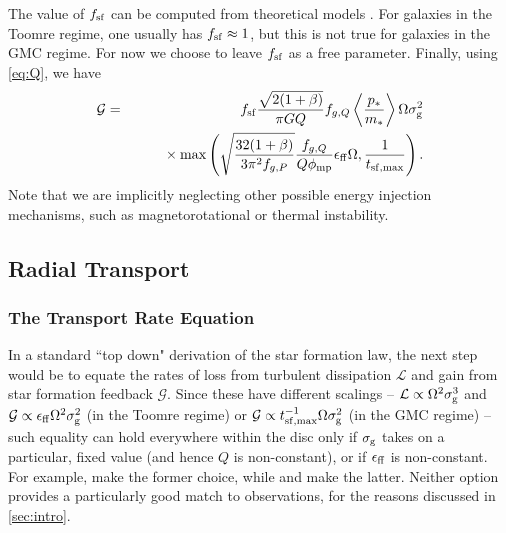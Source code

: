 \documentclass[useAMS,usenatbib]{mn2e}
\newcommand{\calL}{\mathcal{L}}
\newcommand{\calG}{\mathcal{G}}
\newcommand{\phimp}{\phi_{\mathrm{mp}}}
\begin{document}
The value of $f_{\rm sf}$ can be computed from theoretical models \citep[e.g.,][]{krumholz09a, krumholz09b, mckee10a, krumholz13c}. For galaxies in the Toomre regime, one usually has $f_{\rm sf}\approx 1$, but this is not true for galaxies in the GMC regime. For now we choose to leave $f_{\rm sf}$ as a free parameter. Finally, using \autoref{eq:Q}, we have
\begin{eqnarray}
\mathcal{G} & = & f_{\rm sf} \frac{\sqrt{2(1+\beta)}}{\pi G Q} f_{g,Q}  \left\langle\frac{p_*}{m_*}\right\rangle \Omega \sigma_{\rm g}^2
\nonumber \\
& & \qquad {} \times \max\left(
\sqrt{\frac{32(1+\beta)}{3\pi^2 f_{g,P}}}\frac{f_{g,Q}}{Q \phimp}\epsilon_{\rm ff} \Omega,
\frac{1}{t_{\rm sf,max}}\right).
\end{eqnarray}
Note that we are implicitly neglecting other possible energy injection mechanisms, such as magnetorotational or thermal instability.

\subsection{Radial Transport}

\subsubsection{The Transport Rate Equation}

In a standard ``top down" derivation of the star formation law, the next step would be to equate the rates of loss from turbulent dissipation $\calL$ and gain from star formation feedback $\calG$. Since these have different scalings -- $\calL \propto \Omega^2 \sigma_{\rm g}^3$ and $\calG \propto \epsilon_{\rm ff} \Omega^2 \sigma_{\rm g}^2$ (in the Toomre regime) or $\calG \propto t_{\rm sf,max}^{-1} \Omega \sigma_{\rm g}^2$ (in the GMC regime) -- such equality can hold everywhere within the disc only if $\sigma_{\rm g}$ takes on a particular, fixed value (and hence $Q$ is non-constant), or if $\epsilon_{\rm ff}$ is non-constant. For example, \citet{ostriker11a} make the former choice, while \citet{faucher-giguere13a} and \citet{hayward17a} make the latter. Neither option provides a particularly good match to observations, for the reasons discussed in \autoref{sec:intro}.
\end{document}
